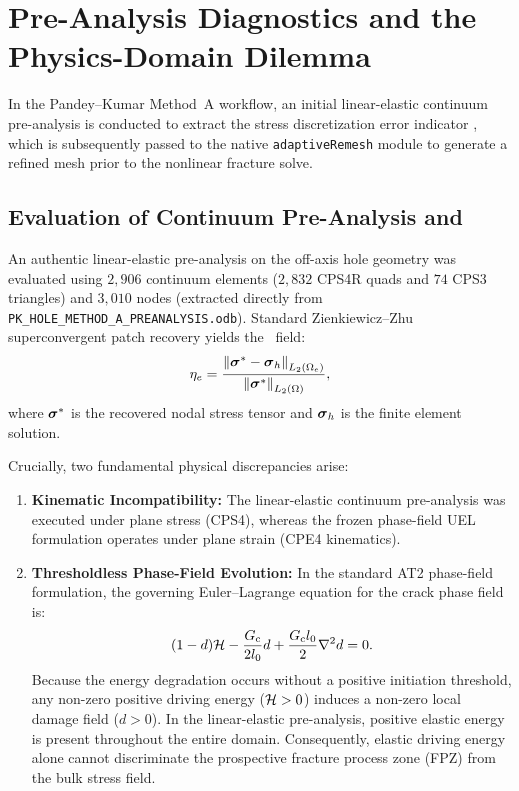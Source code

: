 \section{Pre-Analysis Diagnostics and the Physics-Domain Dilemma}
\label{sec:hole_preanalysis}

In the Pandey--Kumar Method~A workflow, an initial linear-elastic continuum pre-analysis is conducted to extract the stress discretization error indicator \MISESERI, which is subsequently passed to the native \Abaqus \texttt{adaptiveRemesh} module to generate a refined mesh prior to the nonlinear fracture solve.

\subsection{Evaluation of Continuum Pre-Analysis and \MISESERI}
\label{subsec:hole_miseseri_eval}

An authentic linear-elastic pre-analysis on the off-axis hole geometry was evaluated using $2{,}906$ continuum elements ($2{,}832$ CPS4R quads and $74$ CPS3 triangles) and $3{,}010$ nodes (extracted directly from \texttt{PK\_HOLE\_METHOD\_A\_PREANALYSIS.odb}). Standard Zienkiewicz--Zhu superconvergent patch recovery \citep{zienkiewicz1987} yields the \MISESERI\ field:
\begin{equation}
  \eta_e = \frac{\left\| \boldsymbol{\sigma}^* - \boldsymbol{\sigma}_h \right\|_{L_2(\Omega_e)}}{\left\| \boldsymbol{\sigma}^* \right\|_{L_2(\Omega)}},
  \label{eq:miseseri_formula}
\end{equation}
where $\boldsymbol{\sigma}^*$ is the recovered nodal stress tensor and $\boldsymbol{\sigma}_h$ is the finite element solution.

Crucially, two fundamental physical discrepancies arise:
\begin{enumerate}
  \item \textbf{Kinematic Incompatibility:} The linear-elastic continuum pre-analysis was executed under plane stress (CPS4), whereas the frozen phase-field UEL formulation operates under plane strain (CPE4 kinematics).
  \item \textbf{Thresholdless Phase-Field Evolution:} In the standard AT2 phase-field formulation, the governing Euler--Lagrange equation for the crack phase field is:
  \begin{equation}
    (1-d)\mathcal{H} - \frac{G_{\mathrm{c}}}{2 l_0} d + \frac{G_{\mathrm{c}} l_0}{2} \nabla^2 d = 0.
    \label{eq:at2_euler_lagrange}
  \end{equation}
  Because the energy degradation occurs without a positive initiation threshold, any non-zero positive driving energy ($\mathcal{H} > 0$) induces a non-zero local damage field ($d > 0$). In the linear-elastic pre-analysis, positive elastic energy is present throughout the entire domain. Consequently, elastic driving energy alone cannot discriminate the prospective fracture process zone (FPZ) from the bulk stress field.
\end{enumerate}

